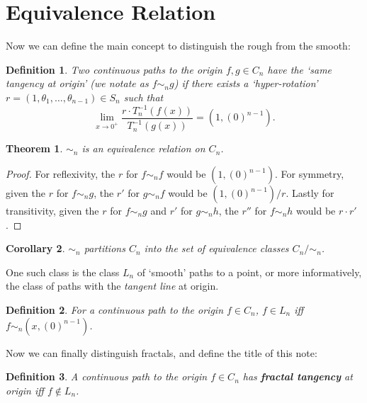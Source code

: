 \documentclass{article}
\theoremstyle{plain}
\newtheorem{definition}{Definition}[section]
\newtheorem{theorem}{Theorem}[section]
\newtheorem{corollary}[theorem]{Corollary}
\begin{document}
\section{Equivalence Relation}
Now we can define the main concept to distinguish the rough from the smooth:
\begin{definition}\label{equiv}
Two continuous paths to the origin $f, g \in C_n$ have the `same tangency at origin' (we notate as $f \sim_n g$) if there exists a `hyper-rotation' $r = (1, \theta_1, \ldots, \theta_{n-1}) \in S_n$ such that $$\lim_{x\rightarrow 0^{+}} \frac{r \cdot T_n^{-1}(f(x))}{T_n^{-1}(g(x))} = (1, (0)^{n-1}).$$
\end{definition}
\begin{theorem}
$\sim_n$ is an equivalence relation on $C_n$.
\end{theorem}
\begin{proof}
For reflexivity, the $r$ for $f \sim_n f$ would be $(1, (0)^{n-1})$. For symmetry, given the $r$ for $f \sim_n g$, the $r'$ for $g \sim_n f$ would be $(1, (0)^{n-1})/r$. Lastly for transitivity, given the $r$ for $f \sim_n g$ and $r'$ for $g \sim_n h$, the $r''$ for $f \sim_n h$ would be $r \cdot r'$.
\end{proof}
\begin{corollary}
$\sim_n$ partitions $C_n$ into the set of equivalence classes $C_n / \sim_n$.
\end{corollary}
One such class is the class $L_n$ of `smooth' paths to a point, or more informatively, the class of paths with the \textit{tangent line} at origin.
\begin{definition}
For a continuous path to the origin $f \in C_n$, $f \in L_n$ iff $f \sim_n (x, (0)^{n-1})$.
\end{definition}
Now we can finally distinguish fractals, and define the title of this note:
\begin{definition}
A continuous path to the origin $f \in C_n$  has \textbf{fractal tangency} at origin iff $f \not\in L_n$.
\end{definition}
\end{document}
